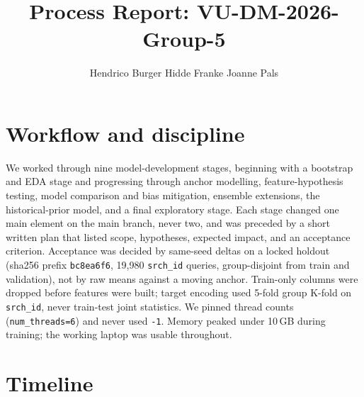 \documentclass[a4paper,10pt]{article}
\title{Process Report: VU-DM-2026-Group-5}
\author{Hendrico Burger \quad Hidde Franke \quad Joanne Pals}
\date{}
\begin{document}
\maketitle
\thispagestyle{empty}

\section*{Workflow and discipline}

We worked through nine model-development stages, beginning with a
bootstrap and EDA stage and progressing through anchor modelling,
feature-hypothesis testing, model comparison and bias mitigation,
ensemble extensions, the historical-prior model, and a final
exploratory stage. Each stage changed one main element on the main
branch, never two, and was preceded by a short written plan that
listed scope, hypotheses, expected impact, and an acceptance
criterion. Acceptance was decided by same-seed deltas on a locked
holdout (sha256 prefix \texttt{bc8ea6f6}, 19{,}980 \texttt{srch\_id}
queries, group-disjoint from train and validation), not by raw means
against a moving anchor. Train-only columns were dropped before
features were built; target encoding used 5-fold group K-fold on
\texttt{srch\_id}, never train-test joint statistics. We pinned
thread counts (\texttt{num\_threads=6}) and never used \texttt{-1}.
Memory peaked under 10\,GB during training; the working laptop was
usable throughout.

\section*{Timeline}
\end{document}
